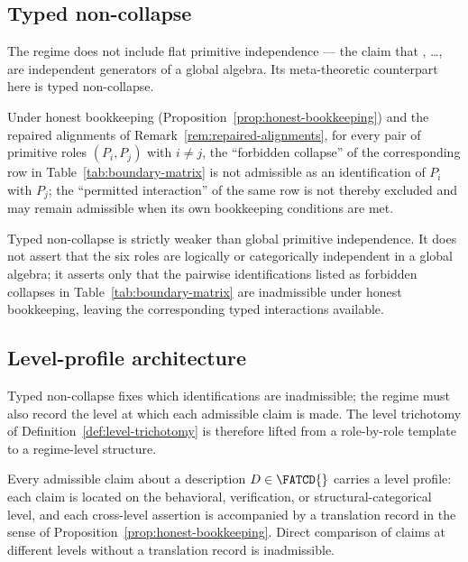 \subsection{Typed non-collapse}\label{subsec:typed-non-collapse}

The regime does not include flat primitive independence --- the claim
that \Pone{}, \ldots, \Psix{} are independent generators of a global
algebra. Its meta-theoretic counterpart here is typed non-collapse.

\begin{proposition}\label{prop:typed-non-collapse}
Under honest bookkeeping (Proposition~\ref{prop:honest-bookkeeping}) and
the repaired alignments of Remark~\ref{rem:repaired-alignments}, for
every pair of primitive roles \((P_i, P_j)\) with \(i \ne j\), the
``forbidden collapse'' of the corresponding row in
Table~\ref{tab:boundary-matrix} is not admissible as an identification
of \(P_i\) with \(P_j\); the ``permitted interaction'' of the same row is
not thereby excluded and may remain admissible when its own bookkeeping
conditions are met.
\end{proposition}

\begin{remark}\label{rem:typed-non-collapse-vs-independence}
Typed non-collapse is strictly weaker than global primitive
independence. It does not assert that the six roles are logically or
categorically independent in a global algebra; it asserts only that
the pairwise identifications listed as forbidden collapses in
Table~\ref{tab:boundary-matrix} are inadmissible under honest
bookkeeping, leaving the corresponding typed interactions available.
\end{remark}


\subsection{Level-profile architecture}\label{subsec:level-profile-architecture}

Typed non-collapse fixes which identifications are inadmissible; the
regime must also record the level at which each admissible claim is
made. The level trichotomy of Definition~\ref{def:level-trichotomy}
is therefore lifted from a role-by-role template to a regime-level
structure.

\begin{proposition}\label{prop:level-profile}
Every admissible claim about a description \(D \in \FATCD{}\) carries a
level profile: each claim is located on the behavioral, verification, or
structural-categorical level, and each cross-level assertion is
accompanied by a translation record in the sense of
Proposition~\ref{prop:honest-bookkeeping}. Direct comparison of claims at
different levels without a translation record is inadmissible.
\end{proposition}

